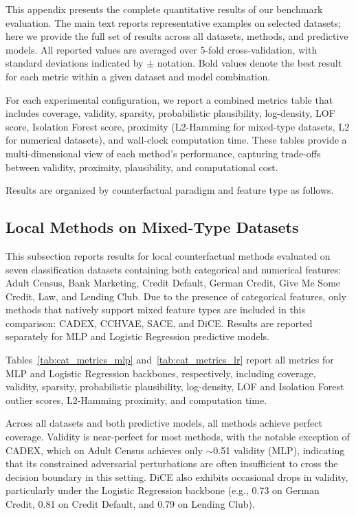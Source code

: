 \documentclass[runningheads]{llncs}
\begin{document}
This appendix presents the complete quantitative results of our benchmark evaluation. The main text reports representative examples on selected datasets; here we provide the full set of results across all datasets, methods, and predictive models. All reported values are averaged over 5-fold cross-validation, with standard deviations indicated by $\pm$ notation. Bold values denote the best result for each metric within a given dataset and model combination.

For each experimental configuration, we report a combined metrics table that includes coverage, validity, sparsity, probabilistic plausibility, log-density, LOF score, Isolation Forest score, proximity (L2-Hamming for mixed-type datasets, L2 for numerical datasets), and wall-clock computation time. These tables provide a multi-dimensional view of each method's performance, capturing trade-offs between validity, proximity, plausibility, and computational cost.

Results are organized by counterfactual paradigm and feature type as follows.

\subsection{Local Methods on Mixed-Type Datasets}

This subsection reports results for local counterfactual methods evaluated on seven classification datasets containing both categorical and numerical features: Adult Census, Bank Marketing, Credit Default, German Credit, Give Me Some Credit, Law, and Lending Club. Due to the presence of categorical features, only methods that natively support mixed feature types are included in this comparison: CADEX, CCHVAE, SACE, and DiCE. Results are reported separately for MLP and Logistic Regression predictive models.

Tables~\ref{tab:cat_metrics_mlp} and~\ref{tab:cat_metrics_lr} report all metrics for MLP and Logistic Regression backbones, respectively, including coverage, validity, sparsity, probabilistic plausibility, log-density, LOF and Isolation Forest outlier scores, L2-Hamming proximity, and computation time.

Across all datasets and both predictive models, all methods achieve perfect coverage. Validity is near-perfect for most methods, with the notable exception of CADEX, which on Adult Census achieves only $\sim$0.51 validity (MLP), indicating that its constrained adversarial perturbations are often insufficient to cross the decision boundary in this setting. DiCE also exhibits occasional drops in validity, particularly under the Logistic Regression backbone (e.g., 0.73 on German Credit, 0.81 on Credit Default, and 0.79 on Lending Club).
\end{document}
